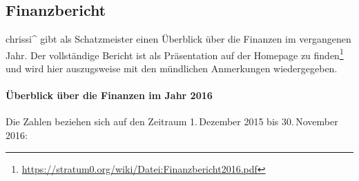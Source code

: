 \documentclass[parskip=half-]{s0minutes}
\begin{document}
\subsection{Finanzbericht}

chrissi\^{} gibt als Schatzmeister einen Überblick über die Finanzen im
vergangenen Jahr. Der vollständige Bericht ist als Präsentation auf der Homepage
zu finden\footnote{\url{https://stratum0.org/wiki/Datei:Finanzbericht2016.pdf}}
und wird hier auszugsweise mit den mündlichen Anmerkungen wiedergegeben.

\paragraph{Überblick über die Finanzen im Jahr 2016}
Die Zahlen beziehen sich auf den Zeitraum 1.\,Dezember 2015 bis 30.\,November
2016:

\newpage
\end{document}
